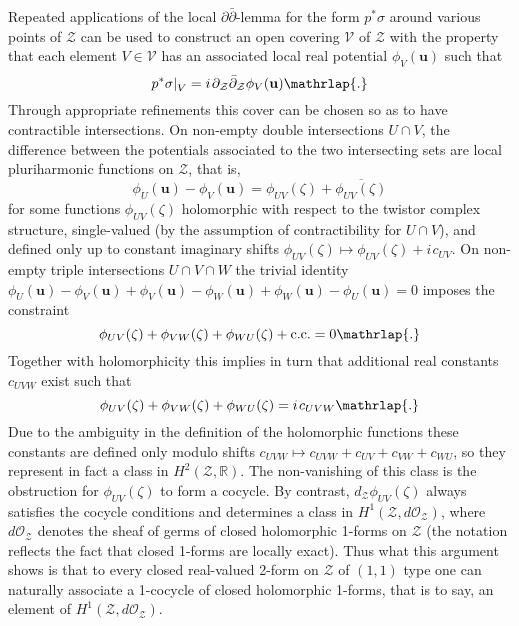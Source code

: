 \documentclass[11pt]{amsart}
\theoremstyle{remark}
\theoremstyle{remark}
\theoremstyle{definition}
\theoremstyle{definition}
\theoremstyle{definition}
\newcommand{\0}{{\scriptstyle 0'}} %
\newcommand{\1}{{\scriptstyle 1'}}
\newcommand{\pt}{\hspace{1pt}} %
\newcommand{\hp}{\hspace{0.5pt}} %
\begin{document}
Repeated applications of the local \mbox{$\partial\bar{\partial}$\pt-\hp lemma} for the form $p^*\sigma$ around various points of $\mathcal{Z}$ can be used to construct an open covering $\mathscr{V}$ of $\mathcal{Z}$ with the property that each element $V \in \mathscr{V}$ has an associated local real potential $\phi_V(\mathbf{u})$ such that
\begin{equation}
p^*\sigma |_{V}^{\phantom{I}} = i \pt \partial_{\mathcal{Z}}\bar{\partial}_{\mathcal{Z}} \phi_V(\mathbf{u}) \mathrlap{.}
\end{equation}
Through appropriate refinements this cover can be chosen so as to have contractible intersections. On non-empty double intersections $U \cap V$, the difference between the potentials associated to the two intersecting sets are local pluriharmonic functions on $\mathcal{Z}$, that is,
\begin{equation} \label{pot_gluing}
\phi_U(\mathbf{u}) - \phi_V(\mathbf{u}) = \phi_{UV}(\zeta) + \overline{\phi_{UV}(\zeta)}
\end{equation}
for some functions $\phi_{UV}(\zeta)$ holomorphic with respect to the twistor complex structure, single-valued (by the assumption of contractibility for $U \cap V$), and defined only up to constant imaginary shifts $\phi_{UV}(\zeta) \mapsto \phi_{UV}(\zeta) + i \pt c_{UV}$.  On non-empty triple intersections $U \cap V \cap W$ the trivial identity $\phi_U(\mathbf{u}) - \phi_V(\mathbf{u}) + \phi_V(\mathbf{u}) - \phi_W(\mathbf{u}) + \phi_W(\mathbf{u}) - \phi_U(\mathbf{u}) = 0$ imposes the constraint
\begin{equation}
\phi_{UV}(\zeta) + \phi_{VW}(\zeta) + \phi_{WU}(\zeta) + \text{c.c.} = 0 \mathrlap{.}
\end{equation}
Together with holomorphicity this implies in turn that additional real constants $c_{UVW}$ exist such that 
\begin{equation} \label{pre-cycle}
\phi_{UV}(\zeta) + \phi_{VW}(\zeta) + \phi_{WU}(\zeta) = i \pt c_{UVW} \mathrlap{.}
\end{equation}
Due to the ambiguity in the definition of the holomorphic functions these constants are defined only modulo shifts $c_{UVW} \mapsto c_{UVW}  + c_{UV} + c_{VW} + c_{WU}$, so they represent in fact a class in $H^2(\mathcal{Z},\mathbb{R})$. 
The non-vanishing of this class is the obstruction for $\phi_{UV}(\zeta)$ to form a cocycle. By contrast, $d_{\mathcal{Z}}\phi_{UV}(\zeta)$ always satisfies the cocycle conditions and determines a class in $H^1(\mathcal{Z},d\mathcal{O}_{\mathcal{Z}})$, where $d\mathcal{O}_{\mathcal{Z}}$ denotes the sheaf of germs of closed holomorphic 1-forms on $\mathcal{Z}$ (the notation reflects the fact that closed 1-forms are locally exact). Thus what this argument shows is that to every closed real-valued 2-form on $\mathcal{Z}$ of $(1,1)$ type one can naturally associate a 1-cocycle of closed holomorphic 1-forms, that is to say, an element of $H^1(\mathcal{Z},d\mathcal{O}_{\mathcal{Z}})$. 
\end{document}
